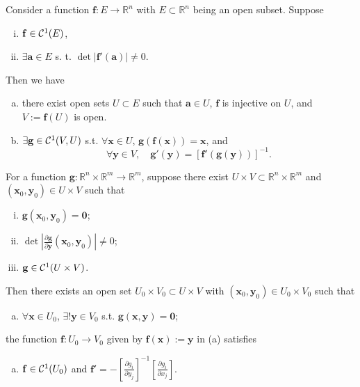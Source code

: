 \begin{thm}
  \label{thm:inverseFunc}
  Consider a function $\mathbf{f}: E\rightarrow \mathbb{R}^n$
  with $E\subset \mathbb{R}^n$ being an open subset.
  Suppose
  \begin{enumerate}[(i)]\itemsep0em
  \item $\mathbf{f}\in {\cal C}^1(E)$,
  \item $\exists\mathbf{a}\in E$ s. t.
    $\det|\mathbf{f}'(\mathbf{a})|\ne 0$.
  \end{enumerate}
  Then we have
  \begin{enumerate}[(a)]\itemsep0em
  \item there exist open sets $U\subset E$ such that
    $\mathbf{a}\in U$, %
    $\mathbf{f}$ is injective on $U$,
    and $V:=\mathbf{f}(U)$ is open.
  \item $\exists \mathbf{g}\in {\cal C}^1(V,U)$ s.t. 
    $\forall \mathbf{x}\in U$, $\mathbf{g}(\mathbf{f}(\mathbf{x}))=\mathbf{x}$, 
    and
    \begin{equation}
      \label{eq:inverseFuncDeriv}
      \forall \mathbf{y}\in V,\quad
      \mathbf{g}'(\mathbf{y}) = [\mathbf{f}'(\mathbf{g}(\mathbf{y}))]^{-1}.
    \end{equation}
  \end{enumerate}
\end{thm}



\begin{thm}
  \label{thm:implicitFunction}
  For a function $\mathbf{g}:
  \mathbb{R}^n\times \mathbb{R}^m\to \mathbb{R}^m$,
  suppose there exist
  $U\times V\subset \mathbb{R}^n\times \mathbb{R}^m$
  and $(\mathbf{x}_0, \mathbf{y}_0)\in U\times V$
  such that
  \begin{enumerate}[(i)]\itemsep0em
  \item $\mathbf{g}(\mathbf{x}_0, \mathbf{y}_0)=\mathbf{0}$; 
  \item $\det\left|\frac{\partial \mathbf{g}}{\partial
        \mathbf{y}}(\mathbf{x}_0, \mathbf{y}_0)\right|\ne 0$;
  \item $\mathbf{g}\in {\cal C}^1(U\times V)$.
  \end{enumerate}
  Then there exists an open set $U_0\times V_0\subset U\times V$
  with $(\mathbf{x}_0,\mathbf{y}_0)\in U_0\times V_0$ such that
  \begin{enumerate}[(a)]\itemsep0em
  \item $\forall \mathbf{x}\in U_0$, $\exists! \mathbf{y}\in V_0$ s.t.
    $\mathbf{g}(\mathbf{x}, \mathbf{y})=\mathbf{0}$; 
  \end{enumerate}
  the function $\mathbf{f}: U_0\to V_0$ given by
  $\mathbf{f}(\mathbf{x}) := \mathbf{y}$ in (a) satisfies
  \begin{enumerate}[(b)]\itemsep0em
  \item $\mathbf{f}\in{\cal C}^1(U_0)$ and
    $\mathbf{f}'=-[\frac{\partial g_i}{\partial y_j}]^{-1}
    [\frac{\partial g_i}{\partial x_j}]$.
  \end{enumerate}
\end{thm}





